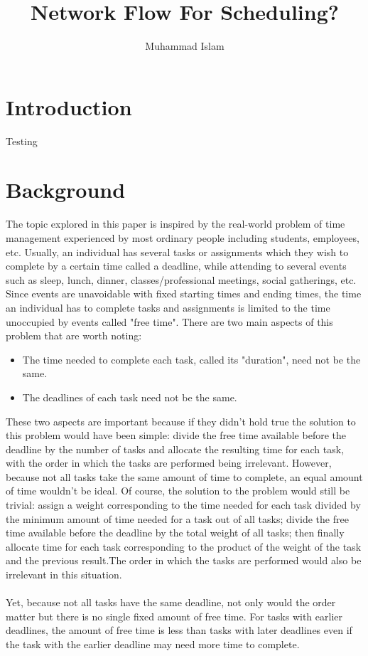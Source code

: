 \documentclass[11pt]{article}
\title{Network Flow For Scheduling?}
\author{Muhammad Islam}
\begin{document}
\maketitle
\section{Introduction}
Testing
\section{Background}
The topic explored in this paper is inspired by the real-world problem of time management experienced by most ordinary people including students, employees, etc. Usually, an individual has several tasks or assignments which they wish to complete by a certain time called a deadline, while attending to several events such as sleep, lunch, dinner, classes/professional meetings, social gatherings, etc. Since events are unavoidable with fixed starting times and ending times, the time an individual has to complete tasks and assignments is limited to the time unoccupied by events called "free time". There are two main aspects of this problem that are worth noting:
\begin{itemize}
\item The time needed to complete each task, called its "duration", need not be the same.
\item The deadlines of each task need not be the same.
\end{itemize}
These two aspects are important because if they didn't hold true the solution to this problem would have been simple: divide the free time available before the deadline by the number of tasks and allocate the resulting time for each task, with the order in which the tasks are performed being irrelevant. However, because not all tasks take the same amount of time to complete, an equal amount of time wouldn't be ideal. Of course, the solution to the problem would still be trivial: assign a weight corresponding to the time needed for each task divided by the minimum amount of time needed for a task out of all tasks; divide the free time available before the deadline by the total weight of all tasks; then finally allocate time for each task corresponding to the product of the weight of the task and the previous result.The order in which the tasks are performed would also be irrelevant in this situation.  \\ \\ 
Yet, because not all tasks have the same deadline, not only would the order matter but there is no single fixed amount of free time. For tasks with earlier deadlines, the amount of free time is less than tasks with later deadlines even if the task with the earlier deadline may need more time to complete.\\ \\
\end{document}
